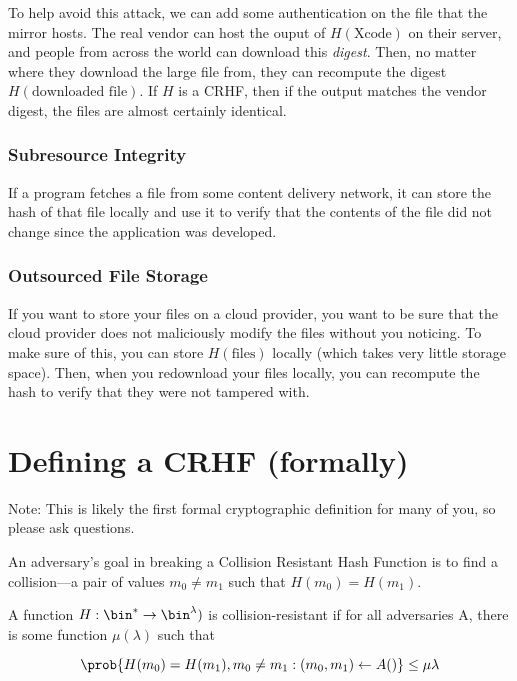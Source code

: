 To help avoid this attack, we can add some authentication on the file that the mirror hosts. The real vendor can host the ouput of $H(\text{Xcode})$ on their server, and people from across the world can download this \textit{digest}. Then, no matter where they download the large file from, they can recompute the digest $H(\text{downloaded file})$. If $H$ is a CRHF, then if the output matches the vendor digest, the files are almost certainly identical.

\subsubsection{Subresource Integrity}
If a program fetches a file from some content delivery network, it can store the hash of that file locally and use it to verify that the contents of the file did not change since the application was developed.

\subsubsection{Outsourced File Storage}
If you want to store your files on a cloud provider, you want to be sure that the cloud provider does not maliciously modify the files without you noticing. To make sure of this, you can store $H(\text{files})$ locally (which takes very little storage space). Then, when you redownload your files locally, you can recompute the hash to verify that they were not tampered with.

\section{Defining a CRHF (formally)}
Note: This is likely the first formal cryptographic definition for many of you, so please ask questions.

An adversary's goal in breaking a Collision Resistant Hash Function is to find a collision---a pair of values $m_0 \neq m_1$ such that $H(m_0) = H(m_1)$.

\begin{definition}
	A function $H: \bin^* \rightarrow \bin^{\lambda})$ is collision-resistant if for all  adversaries A, there is some  function $\mu(\lambda)$ such that 

	\[ \prob{H(m_0) = H(m_1), m_0 \neq m_1: (m_0, m_1) \leftarrow A()} \leq \mu{\lambda} \]

\end{definition}

